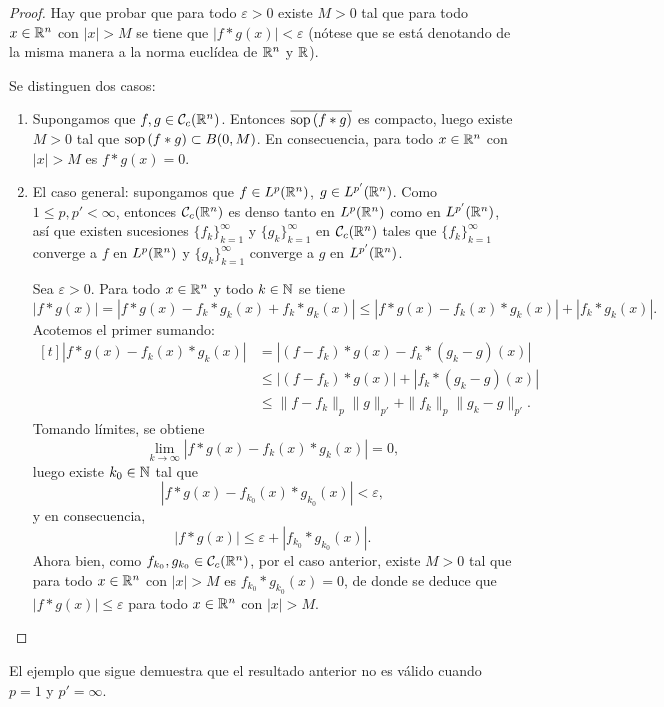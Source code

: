 \documentclass[a4paper, 11pt, oneside]{report}
\begin{document}
\begin{proof}
  Hay que probar que para todo $\varepsilon >0$ existe $M >0$ tal que para todo $x \in \mathbb R^n$ con $|x|>M$ se tiene que $|f \ast g(x)| < \varepsilon$ (nótese que se está denotando de la misma manera a la norma euclídea de $\mathbb R^n$ y $\mathbb R$).

  Se distinguen dos casos:
  \begin{enumerate}
    \item Supongamos que $f,g \in \mathcal{C}_c(\mathbb R^n)$. Entonces $\overline{\textup{sop}\, (f \ast g)}$ es compacto, luego existe $M >0$ tal que $\textup{sop}\,(f \ast g) \subset B(0,M)$. En consecuencia, para todo $x \in \mathbb R^n$ con $|x| > M$ es $f \ast g(x)=0$.
    \item El caso general: supongamos que $f \in L^p(\mathbb R^n)$, $g \in L^{p'}(\mathbb R^n)$. Como $1 \leq p,p' < \infty$, entonces $\mathcal{C}_c(\mathbb R^n)$ es denso tanto en $L^p(\mathbb R^n)$ como en $L^{p'}(\mathbb R^n)$, así que existen sucesiones $\{f_k\}_{k=1}^\infty$ y $\{g_k\}_{k=1}^\infty$ en $\mathcal{C}_c(\mathbb R^n)$ tales que $\{f_k\}_{k=1}^\infty$ converge a $f$ en $L^p(\mathbb R^n)$ y $\{g_k\}_{k=1}^\infty$ converge a $g$ en $L^{p'}(\mathbb R^n)$.
    
    Sea $\varepsilon>0$. Para todo $x \in \mathbb R^n$ y todo $k \in \mathbb N$ se tiene
    \[|f \ast g(x)| = |f \ast g(x) - f_k \ast g_k(x) + f_k \ast g_k(x)| \leq |f \ast g(x) - f_k(x) \ast g_k(x)| + |f_k \ast g_k(x)|.\]
    Acotemos el primer sumando:
    \[\begin{aligned}[t]
      |f \ast g(x) - f_k(x) \ast g_k(x)| &= |(f-f_k)\ast g(x) - f_k \ast(g_k - g)(x)| \\
      &\leq |(f-f_k)\ast g(x)|+|f_k \ast (g_k-g)(x)| \\
      &\leq \|f-f_k\|_p\|g\|_{p'} + \|f_k\|_p\|g_k-g\|_{p'}.
    \end{aligned}\]
    Tomando límites, se obtiene
    \[\lim_{k \to \infty} |f \ast g(x) - f_k(x) \ast g_k(x)| = 0,\]
    luego existe $k_0 \in \mathbb N$ tal que
    \[|f \ast g(x) - f_{k_0}(x) \ast g_{k_0}(x)| < \varepsilon,\]
    y en consecuencia,
    \[|f \ast g(x)| \leq \varepsilon + |f_{k_0} \ast g_{k_0}(x)|.\]
    Ahora bien, como $f_{k_0}, g_{k_0} \in \mathcal{C}_c(\mathbb R^n)$, por el caso anterior, existe $M >0$ tal que para todo $x \in \mathbb R^n$ con $|x|>M$ es $f_{k_0} \ast g_{k_0}(x) = 0$, de donde se deduce que $|f \ast g(x)| \leq \varepsilon$ para todo $x \in \mathbb R^n$ con $|x|>M$. \qedhere
  \end{enumerate}
\end{proof}

El ejemplo que sigue demuestra que el resultado anterior no es válido cuando $p = 1$ y $p' = \infty$.
\end{document}
